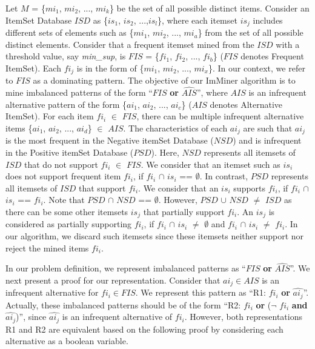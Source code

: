 Let $M$ = \{$mi_1$, $mi_2$, ..., $mi_k$\} be the set of all possible distinct items. Consider an ItemSet Database $ISD$ 
as \{$is_1$, $is_2$, ...,$is_l$\}, where each itemset $is_j$ includes different sets of elements such as \{$mi_1$, $mi_2$, ..., $mi_a$\} from the set of all possible distinct elements. Consider that a frequent itemset mined from the $ISD$ with a threshold value, say \emph{min\_sup}, is $FIS$ = \{$fi_1$, $fi_2$, ..., $fi_b$\} ($FIS$ denotes Frequent ItemSet). Each $fi_j$ is in the form of \{$mi_1$, $mi_2$, ..., $mi_x$\}. In our context, we refer to $FIS$ as a dominating pattern. The objective of our ImMiner algorithm is to mine imbalanced patterns of the form ``$FIS$ \textbf{or} $\hat{AIS}$'', where $AIS$ is an infrequent alternative pattern of the form \{$ai_1$, $ai_2$, ..., $ai_c$\} ($AIS$ denotes Alternative ItemSet). For each item $fi_i$ $\in$ $FIS$, there can be multiple infrequent alternative items \{$ai_1$, $ai_2$, ..., $ai_d$\} $\in$ $AIS$. The characteristics of each $ai_j$ are such that $ai_j$ is the most frequent in the Negative itemSet Database ($NSD$) and is infrequent in the Positive itemSet Database ($PSD$). Here, $NSD$ represents all itemsets of $ISD$ that do not support $fi_i$ $\in$ $FIS$. We consider that an itemset such as $is_i$ does not support frequent item $fi_i$, if $fi_i$ $\cap$ $is_i$ == $\emptyset$. In contrast, $PSD$ represents all itemsets of $ISD$ that support $fi_i$. We consider that an $is_i$ supports $fi_i$, if $fi_i$ $\cap$ $is_i$ == $fi_i$. Note that $PSD$ $\cap$ $NSD$ == $\emptyset$. However, $PSD$ $\cup$ $NSD$ $\neq$ $ISD$ as there can be some other itemsets $is_j$ that partially support $fi_i$. An $is_j$ is considered as partially supporting $fi_i$, if $fi_i$ $\cap$ $is_i$ $\neq$ $\emptyset$ and $fi_i$ $\cap$ $is_i$ $\neq$ $fi_i$. In our algorithm, we discard such itemsets since these itemsets neither support nor reject the mined items $fi_i$.

In our problem definition, we represent imbalanced patterns as ``$FIS$ \textbf{or} $\hat{AIS}$''. We next present a proof for our representation. Consider that $ai_j \in AIS$ is an infrequent alternative for $fi_i \in FIS$. We represent this pattern as ``R1: $fi_i$ \textbf{or} $\hat{ai_j}$''. Actually, these imbalanced patterns should be of the form ``R2: $fi_i$ \textbf{or} ($\neg$ $fi_i$ \textbf{and} $\hat{ai_j}$)'', since $\hat{ai_j}$ is an infrequent alternative of $fi_i$. However, both representations R1 and R2 are equivalent based on the following proof by considering each alternative as a boolean variable.\\

